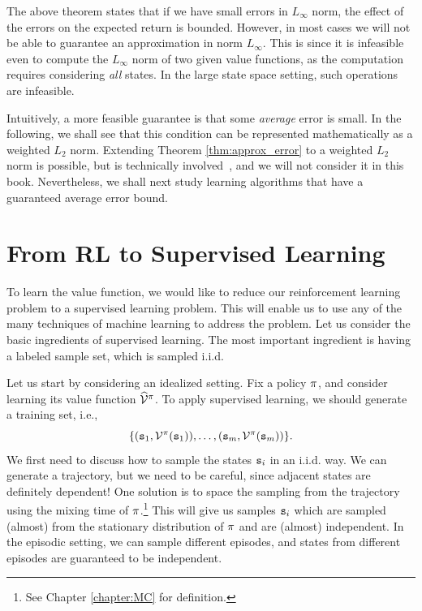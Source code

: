 The above theorem states that if we have small errors in
$L_\infty$ norm, the effect of the errors on the expected return is
bounded. However, in most cases we will not be able to guarantee an
approximation in norm $L_\infty$. This is since it is infeasible even
to compute the $L_\infty$ norm of two given value functions, as the computation requires considering {\em all} states. In the large state space setting, such operations are infeasible. 

Intuitively, a more feasible guarantee is that some \textit{average} error is small. In the following, we shall see that this condition can be represented mathematically as a weighted $L_2$ norm. Extending Theorem \ref{thm:approx_error} to a weighted $L_2$ norm is possible, but is technically involved~\cite{munos2007performance}, and we will not consider it in this book. Nevertheless, we shall next study learning algorithms that have a guaranteed average error bound.

\section{From RL to Supervised Learning}

To learn the value function, we would like to reduce our reinforcement learning problem to a
supervised learning problem. This will enable us to use any of the many techniques of machine learning to address the problem. Let us consider the basic ingredients of supervised learning. The most important ingredient is having a labeled sample set, which is sampled i.i.d.

Let us start by considering an idealized setting. Fix a policy $\pi$, and consider learning its value function $\widehat{\mathcal{V}}^{\pi}$. To apply supervised learning, we should
generate a training set, i.e., 
\[
\{({\tt s}_1, \mathcal{V}^\pi({\tt s}_1)),\ldots,
({\tt s}_m,\mathcal{V}^\pi({\tt s}_m))\}.
\]
We first need to discuss how to sample the states ${\tt s}_i$ in an
i.i.d. way. We can generate a trajectory, but we need to be careful,
since adjacent states are definitely dependent! One solution is to
space the sampling from the trajectory using the mixing time of
$\pi$.\footnote{See Chapter \ref{chapter:MC} for definition.}
This will give us samples ${\tt s}_i$ which are sampled (almost) from the
stationary distribution of $\pi$ and are (almost) independent. In the episodic setting, we can sample different episodes, and states from different episodes are guaranteed to be independent.

